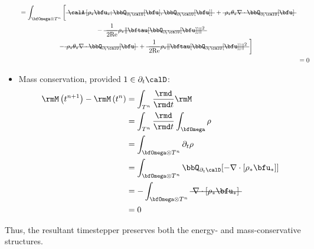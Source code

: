 \begin{itemize}
\begin{align}
\begin{split}
                &=  \int_{\bfOmega\otimes T^{n}}\left[\mst{\calA\left[\rho_{*}\bfu_{*}; \bbQ_{\partial_{t}\calU}[\bfu], \bbQ_{\partial_{t}\calU}[\bfu]\right]} + \mst{\rho_{*}\theta_{*}\nabla\cdot\bbQ_{\partial_{t}\calU}[\bfu]}\tall\right.  \\
                &\qquad\qquad\qquad\qquad\qquad\qquad- \mst{\frac{1}{2\rmRe}\rho_{*}\|\bftau[\bbQ_{\partial_{t}\calU}[\bfu]]\|^{2}}  \\
                &\qquad\qquad\qquad\left.- \mst{\rho_{*}\theta_{*}\nabla\cdot\bbQ_{\partial_{t}\calU}[\bfu]} + \mst{\frac{1}{2\rmRe}\rho_{*}\|\bftau[\bbQ_{\partial_{t}\calU}[\bfu]]\|^{2}}\right]
            \end{split}  \\
                &=  0
        \end{align}

        \item  Mass conservation, provided $1 \in \partial_{t}\calD$:
        \begin{align}
                \rmM\left(t^{n + 1}\right) - \rmM\left(t^{n}\right)  &=  \int_{T^{n}}\frac{\rmd}{\rmd t}\rmM  \\
                &=  \int_{T^{n}}\frac{\rmd}{\rmd t}\int_{\bfOmega}\rho  \\
                &=  \int_{\bfOmega\otimes T^{n}}\partial_{t}\rho  \\
                &=  \int_{\bfOmega\otimes T^{n}}\bbQ_{\partial_{t}\calD}[- \nabla\cdot[\rho_{*}\bfu_{*}]]  \\
                &=  - \int_{\bfOmega\otimes T^{n}}\mst{\nabla\cdot[\rho_{*}\bfu_{*}]}  \\
                &=  0
        \end{align}
    \end{itemize}
    Thus, the resultant timestepper preserves both the energy- and mass-conservative structures.


    